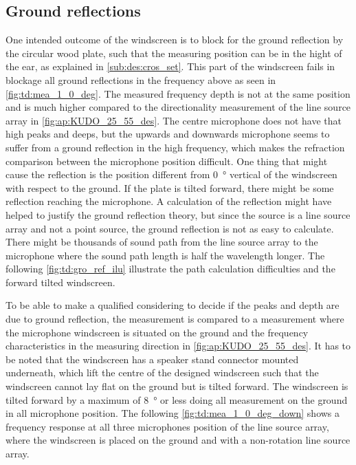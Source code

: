 \subsection{Ground reflections}\label{sec:des:ground_reflection}
One intended outcome of the windscreen is to block for the ground reflection by the circular wood plate, such that the measuring position can be in the hight of the ear, as explained in \autoref{sub:des:cros_set}. This part of the windscreen fails in blockage all ground reflections in the frequency above  as seen in \autoref{fig:td:mea_1_0_deg}. The measured frequency depth is not at the same position and is much higher compared to the directionality measurement of the line source array in \autoref{fig:ap:KUDO_25_55_des}. The centre microphone does not have that high peaks and deeps, but the upwards and downwards microphone seems to suffer from a ground reflection in the high frequency, which makes the refraction comparison between the microphone position difficult. One thing that might cause the reflection is the position different from \SI{0}{\degree} vertical of the windscreen with respect to the ground. If the plate is tilted forward, there might be some reflection reaching the microphone. A calculation of the reflection might have helped to justify the ground reflection theory, but since the source is a line source array and not a point source, the ground reflection is not as easy to calculate. There might be thousands of sound path from the line source array to the microphone where the sound path length is half the wavelength longer. The following \autoref{fig:td:gro_ref_ilu} illustrate the path calculation difficulties and the forward tilted windscreen. 



To be able to make a qualified considering to decide if the peaks and depth are due to ground reflection, the measurement is compared to a measurement where the microphone windscreen is situated on the ground and the frequency characteristics in the measuring direction in \autoref{fig:ap:KUDO_25_55_des}.  It has to be noted that the windscreen has a speaker stand connector mounted underneath, which lift the centre of the designed windscreen such that the windscreen cannot lay flat on the ground but is tilted forward. The windscreen is tilted forward by a maximum of \SI{8}{\degree} or less doing all measurement on the ground in all microphone position. The following \autoref{fig:td:mea_1_0_deg_down} shows a frequency response at all three microphones position of the line source array, where the windscreen is placed on the ground and with a non-rotation line source array.

